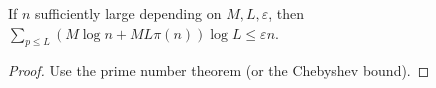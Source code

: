 \begin{sublemma}
\label{bound-score-5}
\leanok
If $n$ sufficiently large depending on $M, L, \varepsilon$, then
$\sum_{p \leq L} (M \log n + M L \pi(n)) \log L \leq \varepsilon n$.
\end{sublemma}
\begin{proof}
\leanok
Use the prime number theorem (or the Chebyshev bound).
\end{proof}
